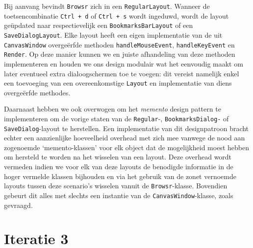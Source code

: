 \documentclass[12pt]{article}
\begin{document}
Bij aanvang bevindt \texttt{Browsr} zich in een \texttt{RegularLayout}. Wanneer de toetsencombinatie \texttt{Ctrl + d} of \texttt{Ctrl + s} wordt ingeduwd, wordt de layout geüpdated naar respectievelijk een \texttt{BookmarksBarLayout} of een \texttt{SaveDialogLayout}. Elke layout heeft een eigen implementatie van de uit \texttt{CanvasWindow} overgeërfde methoden \texttt{handleMouseEvent}, \texttt{handleKeyEvent} en \texttt{Render}. Op deze manier kunnen we en juiste afhandeling van deze methoden implementeren en houden we ons design modulair wat het eenvoudig maakt om later eventueel extra dialoogschermen toe te voegen: dit vereist namelijk enkel een toevoeging van een overeenkomstige \texttt{Layout} en implementatie van diens overgeërfde methodes.

Daarnaast hebben we ook overwogen om het \textit{memento} design pattern te implementeren om de vorige staten van de \texttt{Regular}-, \texttt{BookmarksDialog-} of \texttt{SaveDialog}-layout te herstellen. Een implementatie van dit designpatroon bracht echter een aanzienlijke hoeveelheid overhead met zich mee vanwege de nood aan zogenoemde `memento-klassen' voor elk object dat de mogelijkheid moest hebben om hersteld te worden na het wisselen van een layout. Deze overhead wordt vermeden indien we voor elk van deze layouts de benodigde informatie in de hoger vermelde klassen bijhouden en via het gebruik van de zonet vernoemde layouts tussen deze scenario's wisselen vanuit de \texttt{Browsr}-klasse. Bovendien gebeurt dit alles met slechts een instantie van de \texttt{CanvasWindow}-klasse, zoals gevraagd.

\section{Iteratie 3}
\end{document}
